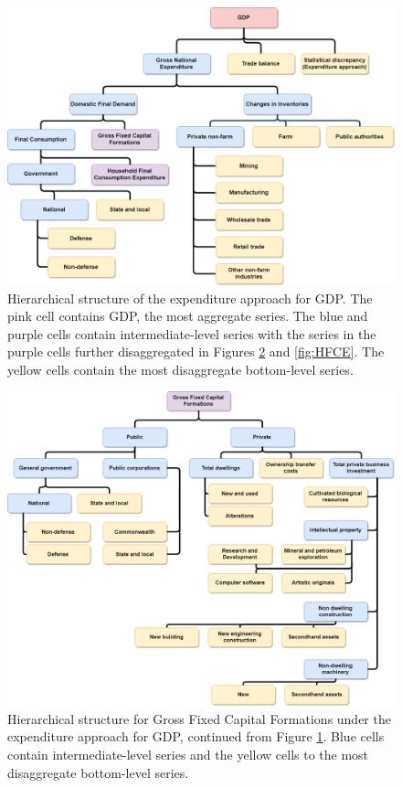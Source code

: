 \documentclass[graybox]{svmult}
\begin{document}
\begin{figure}[t]
	\centering	\includegraphics[width=\textwidth]{Figs/ExpenditureApproach.png}
	\caption{Hierarchical structure of the expenditure approach for GDP. The pink cell contains GDP, the most aggregate series. The blue and purple cells contain intermediate-level series with the series in the purple cells further disaggregated in Figures \ref{fig:GFCF} and \ref{fig:HFCE}. The yellow cells contain the most disaggregate bottom-level series.}\label{fig:GDP_E}
\end{figure}

\begin{figure}[t]
	\centering
	\includegraphics[width=\textwidth]{Figs/GFCF.png}
	\caption{Hierarchical structure for Gross Fixed Capital Formations under the expenditure approach for GDP, continued from Figure \ref{fig:GDP_E}. Blue cells contain intermediate-level series and the yellow cells to the most disaggregate bottom-level series.}\label{fig:GFCF}
\end{figure}
\end{document}
